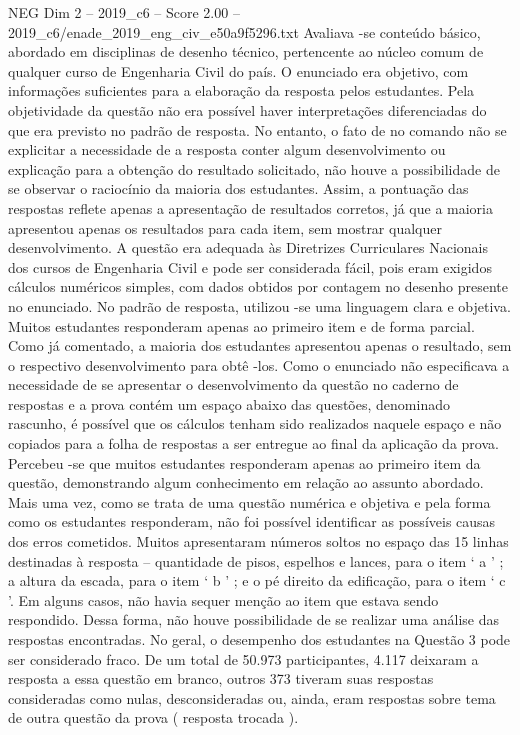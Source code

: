 \begin{textsample}{NEG Dim 2 – 2019\_c6 – Score 2.00 – 2019\_c6/enade\_2019\_eng\_civ\_e50a9f5296.txt}
Avaliava -se conteúdo básico, abordado em disciplinas de desenho técnico, pertencente ao núcleo comum de qualquer curso de Engenharia Civil do país.
O enunciado era objetivo, com informações suficientes para a elaboração da resposta pelos estudantes.
Pela objetividade da questão não era possível haver interpretações diferenciadas do que era previsto no padrão de resposta.
No entanto, o fato de no comando não se explicitar a necessidade de a resposta conter algum desenvolvimento ou explicação para a obtenção do resultado solicitado, não houve a possibilidade de se observar o raciocínio da maioria dos estudantes.
Assim, a pontuação das respostas reflete apenas a apresentação de resultados corretos, já que a maioria apresentou apenas os resultados para cada item, sem mostrar qualquer desenvolvimento.
A questão era adequada às Diretrizes Curriculares Nacionais dos cursos de Engenharia Civil e pode ser considerada fácil, pois eram exigidos cálculos numéricos simples, com dados obtidos por contagem no desenho presente no enunciado.
No padrão de resposta, utilizou -se uma linguagem clara e objetiva.
Muitos estudantes responderam apenas ao primeiro item e de forma parcial.
Como já comentado, a maioria dos estudantes apresentou apenas o resultado, sem o respectivo desenvolvimento para obtê -los.
Como o enunciado não especificava a necessidade de se apresentar o desenvolvimento da questão no caderno de respostas e a prova contém um espaço abaixo das questões, denominado rascunho, é possível que os cálculos tenham sido realizados naquele espaço e não copiados para a folha de respostas a ser entregue ao final da aplicação da prova.
Percebeu -se que muitos estudantes responderam apenas ao primeiro item da questão, demonstrando algum conhecimento em relação ao assunto abordado.
Mais uma vez, como se trata de uma questão numérica e objetiva e pela forma como os estudantes responderam, não foi possível identificar as possíveis causas dos erros cometidos.
Muitos apresentaram números soltos no espaço das 15 linhas destinadas à resposta – quantidade de pisos, espelhos e lances, para o item ‘ a ’ ; a altura da escada, para o item ‘ b ’ ; e o pé direito da edificação, para o item ‘ c ’.
Em alguns casos, não havia sequer menção ao item que estava sendo respondido.
Dessa forma, não houve possibilidade de se realizar uma análise das respostas encontradas.
No geral, o desempenho dos estudantes na Questão 3 pode ser considerado fraco.
De um total de 50.973 participantes, 4.117 deixaram a resposta a essa questão em branco, outros 373 tiveram suas respostas consideradas como nulas, desconsideradas ou, ainda, eram respostas sobre tema de outra questão da prova ( resposta trocada ).

\end{textsample}

